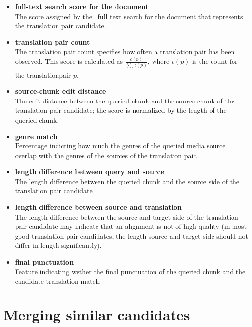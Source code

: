 \begin{itemize}
	
	\item \textbf{full-text search score for the document}\\
	The score assigned by the \postgres~full text search for the document that represents the translation pair candidate.
    
	\item \textbf{translation pair count}\\%
	The translation pair count specifies how often a translation pair has been observed. This score is calculated as $\frac{c(p)}{ \sum_p{c(p)}  } $, where $c(p)$ is the count for the translationpair $p$.
	
	\item \textbf{source-chunk edit distance}\\
	The edit distance between the queried chunk and the source chunk of the translation pair candidate; the score is normalized by the length of the queried chunk.
	
	\item \textbf{genre match}\\
	Percentage indicting how much the genres of the queried media source overlap with the genres of the sources of the translation pair.

	\item \textbf{length difference between query and source}\\
	The length difference between the queried chunk and the source side of the translation pair candidate 


	\item \textbf{length difference between source and translation}\\
	The length difference between the source and target side of the translation pair candidate may indicate that an alignment is not of high quality (in most good translation pair candidates,  the length source and target side should not differ in length significantly).
	
	\item \textbf{final punctuation}\\
	Feature indicating wether the final punctuation of the queried chunk and the candidate translation match.

\end{itemize}



\section{Merging similar candidates}

